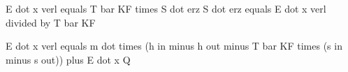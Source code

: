 E dot x verl equals T bar KF times S dot erz  
S dot erz equals E dot x verl divided by T bar KF  

E dot x verl equals m dot times (h in minus h out minus T bar KF times (s in minus s out)) plus E dot x Q
